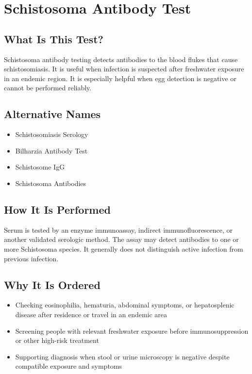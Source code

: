 \chapter{Schistosoma Antibody Test}

\section*{What Is This Test?}
Schistosoma antibody testing detects antibodies to the blood flukes that cause schistosomiasis. It is useful when infection is suspected after freshwater exposure in an endemic region. It is especially helpful when egg detection is negative or cannot be performed reliably.

\section*{Alternative Names}
\begin{itemize}
  \item Schistosomiasis Serology
  \item Bilharzia Antibody Test
  \item Schistosome IgG
  \item Schistosoma Antibodies
\end{itemize}
\section*{How It Is Performed}
Serum is tested by an enzyme immunoassay, indirect immunofluorescence, or another validated serologic method. The assay may detect antibodies to one or more Schistosoma species. It generally does not distinguish active infection from previous infection.

\section*{Why It Is Ordered}
\begin{itemize}
  \item Checking eosinophilia, hematuria, abdominal symptoms, or hepatosplenic disease after residence or travel in an endemic area
  \item Screening people with relevant freshwater exposure before immunosuppression or other high-risk treatment
  \item Supporting diagnosis when stool or urine microscopy is negative despite compatible exposure and symptoms
\end{itemize}

